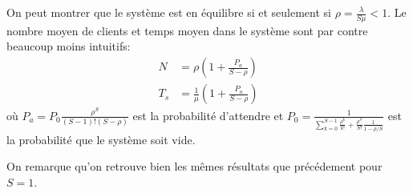     On peut montrer que le système est en équilibre si et seulement si
    $\rho = \frac \lambda {S\mu} < 1$. Le nombre moyen de clients et temps
    moyen dans le système sont par contre beaucoup moins intuitifs:
    \[
      \begin{aligned}
        N   &= \rho \left(1 + \frac{P_a}{S-\rho}\right) \\
        T_s &= \frac{1}{\mu} \left(1 + \frac{P_a}{S-\rho}\right)
      \end{aligned}
    \]
    où $\displaystyle P_a = P_0 \frac{\rho^S}{(S-1)!(S-\rho)}$ est la
    probabilité d'attendre et $\displaystyle P_0 = \frac{1}{\sum_{k=0}^{S-1}
    \frac{\rho^k}{k!} + \frac {\rho^S}{S!} \frac {1}{1-\rho/S} }$ est la
    probabilité que le système soit vide.

    On remarque qu'on retrouve bien les mêmes résultats que précédement pour
    $S=1$.

